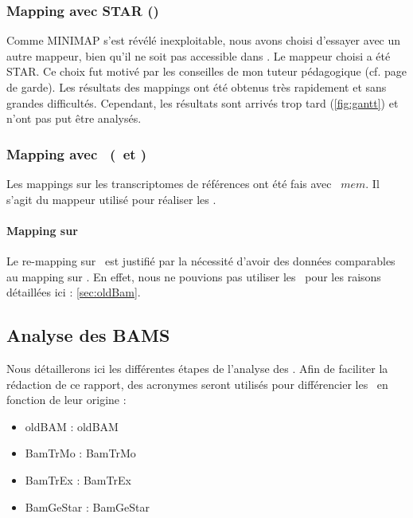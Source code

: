 \documentclass[../main]{subfiles} %
\begin{document}
\subsubsection{Mapping avec \gls{STAR} (\GeMo)}
\label{sec:Star}
Comme \gls{MINIMAP} s’est révélé inexploitable, nous avons choisi d’essayer avec un autre \gls{mappeur}, bien qu’il ne soit pas accessible dans \GeCKO. Le \gls{mappeur} choisi a été \gls{STAR}. Ce choix fut motivé par les conseilles de mon tuteur pédagogique (cf. page de garde). Les résultats des \glspl{mapping} ont été obtenus très rapidement et sans grandes difficultés. Cependant, les résultats sont arrivés trop tard (\cref{fig:gantt}) et n'ont pas put être analysés. 



\subsubsection{Mapping avec \BWA (\TrEx et \TrMo)}
Les mappings sur les \glspl{transcriptome} de références ont été fais avec \BWA $mem$. Il s’agit du \gls{mappeur} utilisé pour réaliser les \OldBam.

\paragraph{Mapping sur \TrEx} Le re-mapping sur \TrEx est justifié par la nécessité d'avoir des données comparables au \gls{mapping} sur \TrMo. En effet, nous ne pouvions pas utiliser les \OldBam pour les raisons détaillées ici : \ref{sec:oldBam}. 




\subsection{Analyse des BAMS}
Nous détaillerons ici les différentes étapes de l'analyse des \bam.
Afin de faciliter la rédaction de ce rapport, des acronymes seront utilisés pour différencier les \bam en fonction de leur origine :
\begin{itemize}
    \item \acrshort{oldBAM} : \acrlong{oldBAM}
    \item \acrshort{BamTrMo} : \acrlong{BamTrMo}
    \item \acrshort{BamTrEx} : \acrlong{BamTrEx}
    \item \acrshort{BamGeStar} : \acrlong{BamGeStar}
\end{itemize}
\end{document}
